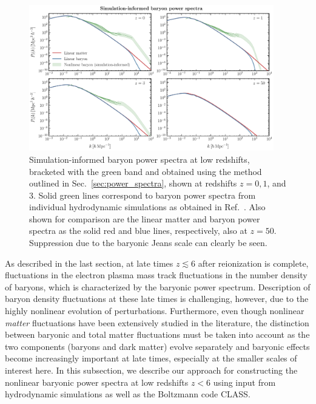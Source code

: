\documentclass[prd,aps,10pt,nofootinbib,twocolumn,superscriptaddress,preprintnumbers,balancelastpage,longbibliography]{revtex4-1}
\begin{document}
%
\begin{figure}[htbp]
    \centering
    \includegraphics[width=0.95\textwidth]{plots/ps_franken}
    \caption{Simulation-informed baryon power spectra at low redshifts, bracketed with the green band and obtained using the method outlined in Sec.~\ref{sec:power_spectra}, shown at redshifts $z = 0, 1$, and 3. Solid green lines correspond to baryon power spectra from individual hydrodynamic simulations as obtained in Ref.~\cite{Foreman:2019ahr}. Also shown for comparison are the linear matter and baryon power spectra as the solid red and blue lines, respectively, also at $z=50$. Suppression due to the baryonic Jeans scale can clearly be seen.~} 
    \label{fig:pspecs}
\end{figure}
%

As described in the last section, at late times $z \lesssim 6$ after reionization is complete, fluctuations in the electron plasma mass track fluctuations in the number density of baryons, which is characterized by the baryonic power spectrum. Description of baryon density fluctuations at these late times is challenging, however, due to the highly nonlinear evolution of perturbations. Furthermore, even though nonlinear \emph{matter} fluctuations have been extensively studied in the literature, the distinction between baryonic and total matter fluctuations must be taken into account as the two components (baryons and dark matter) evolve separately and baryonic effects become increasingly important at late times, especially at the smaller scales of interest here. In this subsection, we describe our approach for constructing the nonlinear baryonic power spectra at low redshifts $z < 6$ using input from hydrodynamic simulations as well as the Boltzmann code CLASS. 
\end{document}
